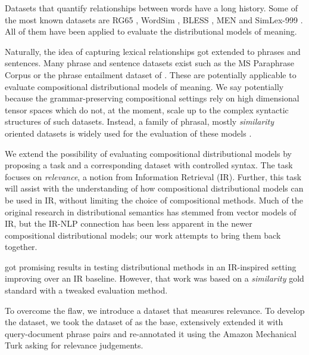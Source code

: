 Datasets that quantify relationships between words have a long history. Some of the most known datasets are RG65 \cite{Rubenstein:1965:CCS:365628.365657}, WordSim \cite{2002:PSC:503104.503110}, BLESS \cite{baroni-lenci:2011:GEMS}, MEN \cite{Bruni:2014:MDS:2655713.2655714} and SimLex-999 \cite{hill2014simlex}. All of them have been applied to evaluate the distributional models of meaning.

Naturally, the idea of capturing lexical relationships got extended to phrases and sentences. Many phrase and sentence datasets exist such as the MS Paraphrase Corpus \cite{dolan2005par} or the phrase entailment dataset of . These are potentially applicable to evaluate compositional distributional models of meaning. We say potentially because the grammar-preserving compositional settings \cite{baroni2014frege,DBLP:journals/corr/abs-1003-4394}  rely on high dimensional tensor spaces which do not, at the moment, scale up to  the complex syntactic structures of such datasets. Instead, a family of phrasal, mostly \emph{similarity} oriented datasets \cite{mitchell-lapata:2008:ACLMain,Grefenstette:2011:ESC:2145432.2145580,kartsaklis-sadrzadeh:2013:EMNLP,kartsadrqpl2014} is widely used for the evaluation of these models \cite{milajevs-EtAl:2014:EMNLP2014,kim-demarneffe-foslerlussier:2015:VSM-NLP}.

We extend the possibility of evaluating compositional distributional models by proposing a task and a corresponding dataset  with controlled syntax. The task focuses on \emph{relevance}, a notion from Information Retrieval (IR).  Further, this task will assist with the understanding of how compositional distributional  models  can be used in IR, without limiting the choice of compositional methods. Much of the original research in distributional semantics has stemmed from vector models of IR, but the IR-NLP connection has been less apparent in  the newer compositional distributional models; our work attempts to bring them back together.

 got promising results in testing distributional methods in an IR-inspired setting improving over an IR baseline. However, that work was based on a \emph{similarity} gold standard with a tweaked evaluation method.

To overcome the flaw, we introduce a dataset that measures relevance. To develop the dataset, we took the  dataset of  as the base, extensively extended it with query-document phrase pairs and re-annotated it using the Amazon Mechanical Turk asking for relevance judgements.

